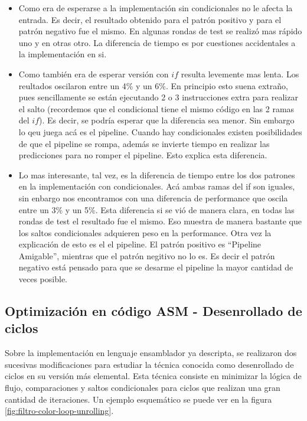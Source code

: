 \begin{itemize}

	\item Como era de esperarse a la implementación sin condicionales no
le afecta la entrada. Es decir, el resultado obtenido para el patrón
positivo y para el patrón negativo fue el mismo. En algunas rondas de
test se realizó mas rápido uno y en otras otro. La diferencia de tiempo
es por cuestiones accidentales a la implementación en si.
	\item Como también era de esperar versión con $if$ resulta levemente
mas lenta. Los reultados oscilaron entre un 4\% y un 6\%. En principio
esto suena extraño, pues sencillamente se están ejecutando 2 o 3 instrucciones
extra para realizar el salto (recordemos que el condicional tiene el mismo código
en las 2 ramas del $if$). Es decir, se podría esperar que la diferencia sea menor.
Sin embargo lo qeu juega acá es el pipeline. Cuando hay condicionales
existen posibilidades de que el pipeline se rompa, además se invierte tiempo
en realizar las predicciones para no romper el pipeline. Esto explica esta diferencia.
	\item Lo mas interesante, tal vez, es la diferencia de tiempo entre
los dos patrones en la implementación con condicionales. Acá ambas ramas
del if son iguales, sin enbargo nos encontramos con una diferencia de performance que oscila
entre un 3\% y un 5\%. Esta diferencia si se vió de manera clara, en todas
las rondas de test el resultado fue el mismo. Eso muestra de manera bastante
que los saltos condicionales adquieren peso en la performance. Otra vez
la explicación de esto es el el pipeline. El patrón positivo es ``Pipeline Amigable'',
mientras que el patrón negitivo no lo es. Es decir el patrón negativo está pensado
para que se desarme el pipeline la mayor cantidad de veces posible.


\end{itemize}


\newpage

\subsection{Optimización en código ASM - Desenrollado de ciclos}
\label{sub:filtro-color-optimizaciones-asm}

Sobre la implementación en lenguaje ensamblador ya descripta, se realizaron dos sucesivas modificaciones para estudiar la técnica conocida como desenrollado de ciclos en su versión más elemental. Esta técnica consiste en minimizar la lógica de flujo, comparaciones y saltos condicionales para ciclos que realizan una gran cantidad de iteraciones. Un ejemplo esquemático se puede ver en la figura \ref{fig:filtro-color-loop-unrolling}.




